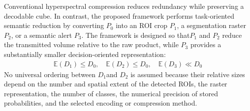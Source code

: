 \documentclass[a4paper,fleqn]{cas-dc}
\begin{document}
Conventional hyperspectral compression reduces redundancy while preserving a decodable cube. In contrast, the proposed framework performs task-oriented semantic reduction by converting \(P_0\) into an ROI crop \(P_1\), a segmentation raster \(P_2\), or a semantic alert \(P_3\). The framework is designed so that\(P_1\) and \(P_2\) reduce the transmitted volume relative to the raw product, while \(P_3\) provides a substantially smaller decision-oriented representation:
\begin{eqnarray}
	\mathbb{E}(D_1) \le D_0, \quad \mathbb{E}(D_2) \le D_0 , \quad \mathbb{E}(D_3) \ll D_0
\end{eqnarray}
No universal ordering between \(D_1 \)and  \(D_2\) is assumed because their relative sizes depend on the number and spatial extent of the detected ROIs, the raster representation, the number of classes, the numerical precision of stored probabilities, and the selected encoding or compression method.
\end{document}
